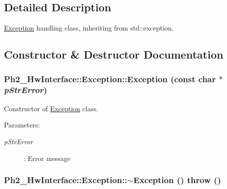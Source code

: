 \subsection{Detailed Description}
\hyperlink{class_ph2___hw_interface_1_1_exception}{Exception} handling class, inheriting from std::exception. 



\subsection{Constructor \& Destructor Documentation}
\hypertarget{class_ph2___hw_interface_1_1_exception_9ac7df51fe36dfb65ff24ca975ec846f}{
\subsubsection[Exception]{\setlength{\rightskip}{0pt plus 5cm}Ph2\_\-Hw\-Interface::Exception::Exception (const char $\ast$ {\em p\-Str\-Error})}}
\label{class_ph2___hw_interface_1_1_exception_9ac7df51fe36dfb65ff24ca975ec846f}


Constructor of \hyperlink{class_ph2___hw_interface_1_1_exception}{Exception} class. 

\begin{Desc}
\item[Parameters:]
\begin{description}
\item[{\em p\-Str\-Error}]: Error message \end{description}
\end{Desc}
\hypertarget{class_ph2___hw_interface_1_1_exception_667217cdbe920cb69842a3d3afb69d35}{
\subsubsection[$\sim$Exception]{\setlength{\rightskip}{0pt plus 5cm}Ph2\_\-Hw\-Interface::Exception::$\sim$Exception ()  throw ()}}
\label{class_ph2___hw_interface_1_1_exception_667217cdbe920cb69842a3d3afb69d35}


